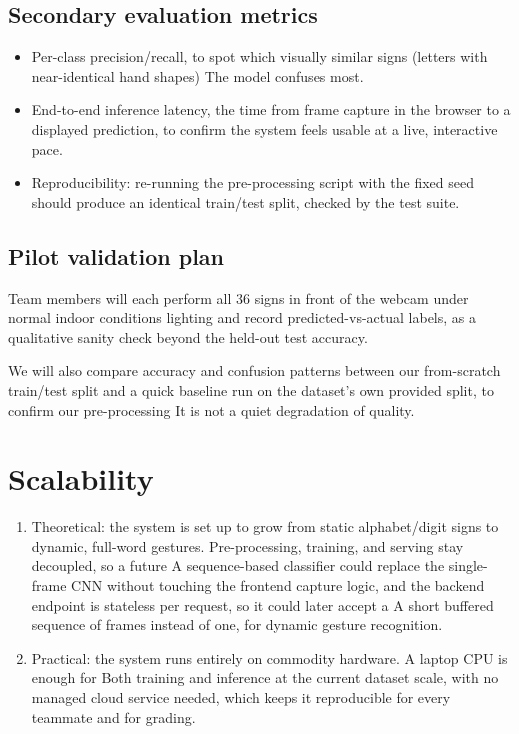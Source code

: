 \documentclass[12pt,a4paper]{article}
\begin{document}
\subsection{Secondary evaluation metrics}

\begin{itemize}[leftmargin=*]

  \item Per-class precision/recall, to spot which visually similar signs (letters with
  near-identical hand shapes) The model confuses most.

  \item End-to-end inference latency, the time from frame capture in the browser to a
  displayed prediction, to confirm the system feels usable at a live, interactive pace.

  \item Reproducibility: re-running the pre-processing script with the fixed seed should
  produce an identical train/test split, checked by the test suite.

\end{itemize}


\subsection{Pilot validation plan}

Team members will each perform all 36 signs in front of the webcam under normal indoor conditions
lighting and record predicted-vs-actual labels, as a qualitative sanity check beyond the
held-out test accuracy.

We will also compare accuracy and confusion patterns between our from-scratch train/test split
and a quick baseline run on the dataset's own provided split, to confirm our pre-processing
It is not a quiet degradation of quality.


\section{Scalability}

\begin{enumerate}[leftmargin=*]

  \item Theoretical: the system is set up to grow from static alphabet/digit signs to dynamic,
  full-word gestures. Pre-processing, training, and serving stay decoupled, so a future
  A sequence-based classifier could replace the single-frame CNN without touching the frontend
  capture logic, and the backend endpoint is stateless per request, so it could later accept a
  A short buffered sequence of frames instead of one, for dynamic gesture recognition.

  \item Practical: the system runs entirely on commodity hardware. A laptop CPU is enough for
  Both training and inference at the current dataset scale, with no managed cloud service
  needed, which keeps it reproducible for every teammate and for grading.

\end{enumerate}
\end{document}
